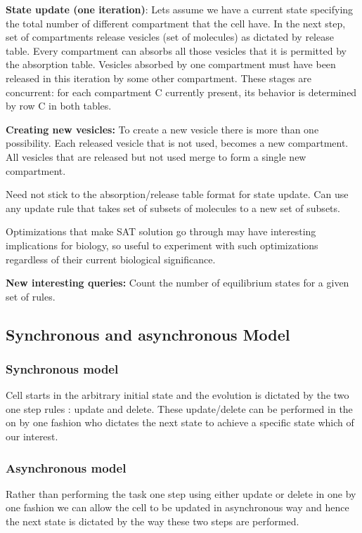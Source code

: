 \documentclass[preprint,12pt]{elsarticle}
\begin{document}
\textbf{State update (one iteration)}: Lets assume we have a current state specifying the total number of different compartment that the cell have. In the next step, set of compartments release vesicles (set of molecules) as dictated by release table. Every compartment can absorbs all those vesicles that it is permitted by the absorption table. Vesicles absorbed by one compartment must have been released in this iteration by some other compartment. These stages are concurrent: for each compartment C currently present, its behavior is determined by row C in both tables.
    
\textbf{ Creating new vesicles:} To create a new vesicle there is more than one possibility. Each released vesicle that is not used, becomes a new compartment. All vesicles that are released but not used merge to form a single new compartment.

Need not stick to the absorption/release table format for state update.  Can use any update rule that takes set of subsets of molecules to a new set of subsets.

Optimizations that make SAT solution go through may have interesting implications for biology, so useful to experiment with such optimizations regardless of their current biological significance.

\textbf{New interesting queries:} Count the number of equilibrium states for a given set of rules.

\subsection{Synchronous and asynchronous Model}
\subsubsection{Synchronous model}
Cell starts in the arbitrary initial state and the evolution is dictated by the two one step rules : update and delete. These update/delete can be performed in the on by one fashion who dictates the next state to achieve a specific state which of our interest. 

\subsubsection{Asynchronous model}
Rather than performing the task one step using either update or delete in one by one fashion we can allow the cell to be updated in asynchronous way and hence the next state is dictated by the way these two steps are performed.
\end{document}
